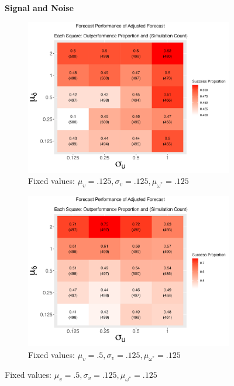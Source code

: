 \documentclass{uiucthesis2021}
\theoremstyle{definition}
\begin{document}
    \begin{figure}[!h]
      \centering
      \textbf{Signal and Noise}\par\medskip
    \begin{subfigure}{.44\linewidth} 
      \centering
        \includegraphics[scale = .42]{simulation_plots/Aug28_224311_2024_mu[delta]_sigma[u].png}
        \caption{Fixed values: $\mu_{v} = .125, \sigma_{v} = .125, \mu_{\omega^{*}} = .125$}\label{fig:sim_1}
    \end{subfigure}\hspace{12mm} %
    \begin{subfigure}{.44\linewidth} 
      \centering
        \includegraphics[scale=.42]{simulation_plots/Aug28_224317_2024_mu[delta]_sigma[u].png}
        \caption{Fixed values: $\mu_{v} = .5, \sigma_{v} = .125, \mu_{\omega^{*}} = .125$}\label{fig:sim_2}
    \end{subfigure}


\end{figure}
\end{document}
